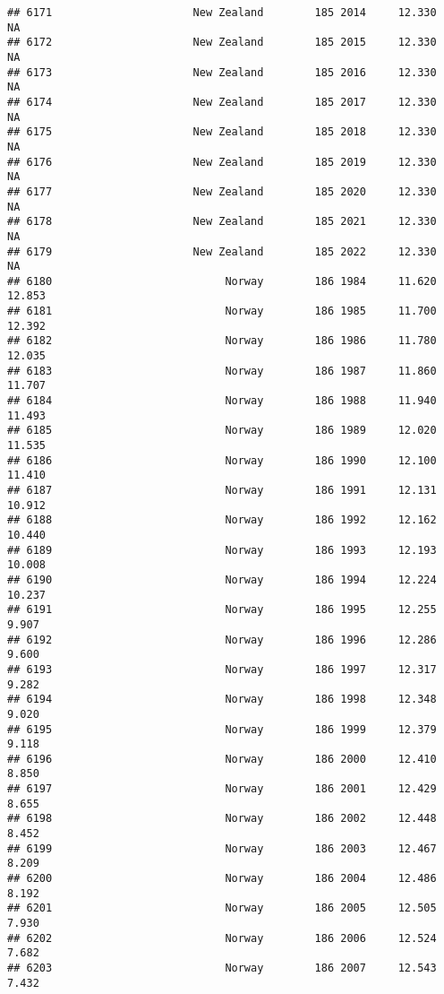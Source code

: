 \documentclass[
]{article}
\begin{document}
\begin{verbatim}
## 6171                      New Zealand        185 2014     12.330         NA
## 6172                      New Zealand        185 2015     12.330         NA
## 6173                      New Zealand        185 2016     12.330         NA
## 6174                      New Zealand        185 2017     12.330         NA
## 6175                      New Zealand        185 2018     12.330         NA
## 6176                      New Zealand        185 2019     12.330         NA
## 6177                      New Zealand        185 2020     12.330         NA
## 6178                      New Zealand        185 2021     12.330         NA
## 6179                      New Zealand        185 2022     12.330         NA
## 6180                           Norway        186 1984     11.620     12.853
## 6181                           Norway        186 1985     11.700     12.392
## 6182                           Norway        186 1986     11.780     12.035
## 6183                           Norway        186 1987     11.860     11.707
## 6184                           Norway        186 1988     11.940     11.493
## 6185                           Norway        186 1989     12.020     11.535
## 6186                           Norway        186 1990     12.100     11.410
## 6187                           Norway        186 1991     12.131     10.912
## 6188                           Norway        186 1992     12.162     10.440
## 6189                           Norway        186 1993     12.193     10.008
## 6190                           Norway        186 1994     12.224     10.237
## 6191                           Norway        186 1995     12.255      9.907
## 6192                           Norway        186 1996     12.286      9.600
## 6193                           Norway        186 1997     12.317      9.282
## 6194                           Norway        186 1998     12.348      9.020
## 6195                           Norway        186 1999     12.379      9.118
## 6196                           Norway        186 2000     12.410      8.850
## 6197                           Norway        186 2001     12.429      8.655
## 6198                           Norway        186 2002     12.448      8.452
## 6199                           Norway        186 2003     12.467      8.209
## 6200                           Norway        186 2004     12.486      8.192
## 6201                           Norway        186 2005     12.505      7.930
## 6202                           Norway        186 2006     12.524      7.682
## 6203                           Norway        186 2007     12.543      7.432

\end{verbatim}
\end{document}

